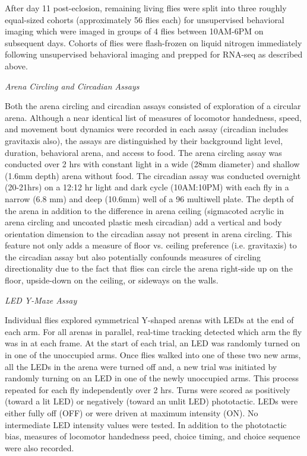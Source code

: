 \documentclass[12pt,letterpaper]{article}
\begin{document}
After day 11 post-eclosion, remaining living flies were split into three roughly equal-sized cohorts (approximately 56 flies each) for unsupervised behavioral imaging which were imaged in groups of 4 flies between 10AM-6PM on subsequent days. Cohorts of flies were flash-frozen on liquid nitrogen immediately following unsupervised behavioral imaging and prepped for RNA-seq as described above.

\textit{Arena Circling and Circadian Assays}

Both the arena circling and circadian assays consisted of exploration of a circular arena. Although a near identical list of measures of locomotor handedness, speed, and movement bout dynamics were recorded in each assay (circadian includes gravitaxis also), the assays are distinguished by their background light level, duration, behavioral arena, and access to food. The arena circling assay was conducted over 2 hrs with constant light in a wide (28mm diameter) and shallow (1.6mm depth) arena without food. The circadian assay was conducted overnight (20-21hrs) on a 12:12 hr light and dark cycle (10AM:10PM)  with each fly in a narrow (6.8 mm) and deep (10.6mm) well of a 96 multiwell plate. The depth of the arena in addition to the difference in arena ceiling (sigmacoted acrylic in arena circling and uncoated plastic mesh circadian) add a vertical and body orientation dimension to the circadian assay not present in arena circling. This feature not only adds a measure of floor vs. ceiling preference (i.e. gravitaxis) to the circadian assay but also potentially confounds measures of circling directionality due to the fact that flies can circle the arena right-side up on the floor, upside-down on the ceiling, or sideways on the walls.

\textit{LED Y-Maze Assay}

Individual flies explored symmetrical Y-shaped arenas with LEDs at the end of each arm. For all arenas in parallel, real-time tracking detected which arm the fly was in at each frame. At the start of each trial, an LED was randomly turned on in one of the unoccupied arms. Once flies walked into one of these two new arms, all the LEDs in the arena were turned off and, a new trial was initiated by randomly turning on an LED in one of the newly unoccupied arms. This process repeated for each fly independently over 2 hrs. Turns were scored as positively (toward a lit LED) or negatively (toward an unlit LED) phototactic. LEDs were either fully off (OFF) or were driven at maximum intensity (ON). No intermediate LED intensity values were tested. In addition to the phototactic bias, measures of locomotor handedness peed, choice timing, and choice sequence were also recorded.
\end{document}
